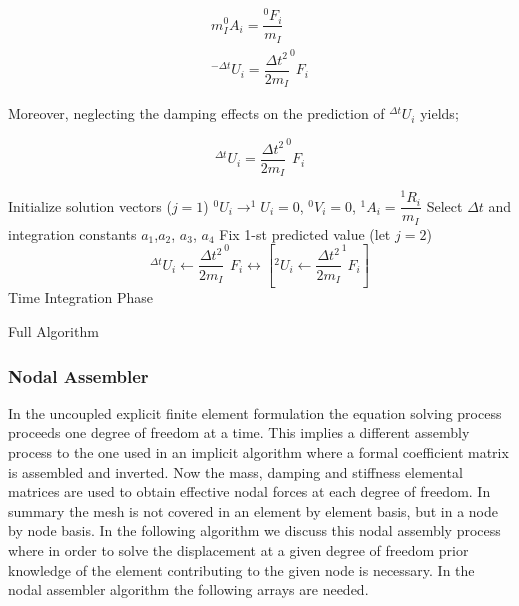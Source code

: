 \[
\begin{aligned}
m_{I} ^{0}A_i=\dfrac{^{0}F_i}{m_I}\\
^{-\Delta t} U_i=\dfrac{\Delta t^2}{2m_I}^{0}F_i
\end{aligned}
\]

Moreover, neglecting the damping effects on the prediction of $^{\Delta t}U_i$ yields;

\[
^{\Delta t} U_i=\dfrac{\Delta t^2}{2m_I}^{0}F_i
\]

\begin{algorithm}[H]
 \SetAlgoLined
 Initialize solution vectors ($j=1$)\;
 $^{0}U_i\longrightarrow ^{1}U_i=0$, $^{0}V_i=0$, $^{1}A_i=\dfrac{^{1}R_i}{m_I}$ \;
 Select $\Delta t$ and integration constants $a_1$,$a_2$, $a_3$, $a_4$\;
 Fix 1-st predicted value (let $j=2$)\;
 \[
^{\Delta t} U_i \longleftarrow \dfrac{\Delta t^2}{2m_I} ^{0}F_i\longleftrightarrow \left[^{2}U_i \longleftarrow\dfrac{\Delta t^2}{2m_I} ^{1}F_i \right]
 \]
Time Integration Phase\;
\caption{Full Algorithm}
\end{algorithm}

\subsubsection{Nodal Assembler}
In the uncoupled explicit finite element formulation the equation solving process proceeds one degree of freedom at a time. This implies a different assembly process to the one used in an implicit algorithm where a formal coefficient matrix is assembled and inverted. Now the mass, damping and stiffness elemental matrices are used to obtain effective nodal forces at each degree of freedom. In summary the mesh is not covered in an element by element basis, but in a node by node basis. In the following algorithm we discuss this nodal assembly process where in order to solve the displacement at a given degree of freedom prior knowledge of the element contributing to the given node is necessary. In the nodal assembler algorithm the following arrays are needed.

